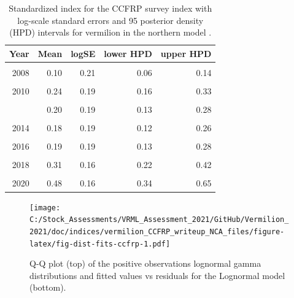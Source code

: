 \documentclass[11pt,
  english,
  a4paper,
]{article}
\begin{document}
\begin{table}

\caption{\label{tab:tab-index-ccfrp}Standardized index for the CCFRP survey index with log-scale standard errors and 95%
       posterior density (HPD) intervals for vermilion in the northern model .}
\centering
\begin{tabular}[t]{rrrrr}
\toprule
Year & Mean & logSE & lower HPD & upper HPD\\
\midrule
\cellcolor{gray!6}{2007} & \cellcolor{gray!6}{0.12} & \cellcolor{gray!6}{0.22} & \cellcolor{gray!6}{0.08} & \cellcolor{gray!6}{0.19}\\
2008 & 0.10 & 0.21 & 0.06 & 0.14\\
\cellcolor{gray!6}{2009} & \cellcolor{gray!6}{0.17} & \cellcolor{gray!6}{0.21} & \cellcolor{gray!6}{0.11} & \cellcolor{gray!6}{0.24}\\
2010 & 0.24 & 0.19 & 0.16 & 0.33\\
\cellcolor{gray!6}{2011} & \cellcolor{gray!6}{0.19} & \cellcolor{gray!6}{0.20} & \cellcolor{gray!6}{0.13} & \cellcolor{gray!6}{0.28}\\
\addlinespace
2012 & 0.20 & 0.19 & 0.13 & 0.28\\
\cellcolor{gray!6}{2013} & \cellcolor{gray!6}{0.10} & \cellcolor{gray!6}{0.22} & \cellcolor{gray!6}{0.06} & \cellcolor{gray!6}{0.15}\\
2014 & 0.18 & 0.19 & 0.12 & 0.26\\
\cellcolor{gray!6}{2015} & \cellcolor{gray!6}{0.26} & \cellcolor{gray!6}{0.20} & \cellcolor{gray!6}{0.17} & \cellcolor{gray!6}{0.38}\\
2016 & 0.19 & 0.19 & 0.13 & 0.28\\
\addlinespace
\cellcolor{gray!6}{2017} & \cellcolor{gray!6}{0.22} & \cellcolor{gray!6}{0.17} & \cellcolor{gray!6}{0.16} & \cellcolor{gray!6}{0.30}\\
2018 & 0.31 & 0.16 & 0.22 & 0.42\\
\cellcolor{gray!6}{2019} & \cellcolor{gray!6}{0.36} & \cellcolor{gray!6}{0.16} & \cellcolor{gray!6}{0.26} & \cellcolor{gray!6}{0.48}\\
2020 & 0.48 & 0.16 & 0.34 & 0.65\\
\bottomrule
\end{tabular}
\end{table}

\FloatBarrier

\begin{figure}
\centering
\texttt{[image: C:/Stock\_Assessments/VRML\_Assessment\_2021/GitHub/Vermilion\_2021/doc/indices/vermilion\_CCFRP\_writeup\_NCA\_files/figure-latex/fig-dist-fits-ccfrp-1.pdf]}
\caption{\label{fig:fig-dist-fits-ccfrp}Q-Q plot (top) of the positive observations lognormal gamma distributions and fitted values vs residuals for the Lognormal model (bottom).}
\end{figure}
\end{document}
